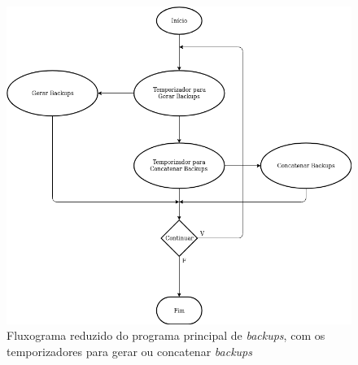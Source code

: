 \documentclass[11pt,twoside,a4paper]{report}
\begin{document}
\begin{figure}
	\begin{center}
		\includegraphics[width=1\textwidth]{fluxograma_simples_backups_programa01} %
		\caption[Fluxograma reduzido do programa principal de \textit{backups}]{Fluxograma reduzido do programa principal de \textit{backups}, com os temporizadores para gerar ou concatenar \textit{backups}}
		\label{fig:backups_simples_programa}
	\end{center}
\end{figure}
\end{document}
